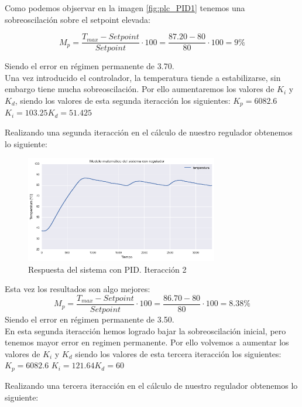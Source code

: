 Como podemos objservar en la imagen \ref{fig:plc_PID1} tenemos una sobreoscilación sobre el setpoint elevada:

$$M_{p}=\frac{T_{max}-Setpoint}{Setpoint} \cdot 100 = \frac{87.20-80}{80} \cdot 100 = 9\%$$ 

Siendo el error en régimen  permanente de 3.70.\\
Una vez introducido el controlador, la temperatura tiende a estabilizarse, sin embargo tiene mucha sobreoscilación. Por ello aumentaremos los valores de $K_i$ y $K_d$, siendo los valores de esta segunda iteracción los siguientes:
$K_p = 6082.6$ $K_i=103.25 K_d=51.425$


Realizando una segunda iteracción en el cálculo de nuestro regulador obtenemos lo siguiente:

    \begin{figure}[H]
            \centering
            \includegraphics[width=0.75\textwidth]{images/PLC/modelado/modelado_30_1.png}
            \caption{Respuesta del sistema con PID. Iteracción 2}
            \label{fig:plc_PID2}
    \end{figure}
Esta vez los resultados son algo mejores:
$$M_{p}=\frac{T_{max}-Setpoint}{Setpoint} \cdot 100 = \frac{86.70-80}{80} \cdot 100 = 8.38\%$$ 
Siendo el error en régimen permanente de 3.50.\\
En esta segunda iteracción hemos logrado bajar la sobreoscilación inicial, pero tenemos mayor error en regimen permanente. Por ello volvemos a aumentar los valores de $K_i$ y $K_d$ siendo los valores de esta tercera iteracción los siguientes:
$K_p = 6082.6$ $K_i=121.64 K_d=60$

Realizando una tercera iteracción en el cálculo de nuestro regulador obtenemos lo siguiente:

